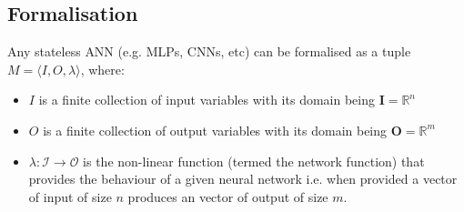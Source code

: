 
\subsection{Formalisation}

\begin{definition}
	\label{def:bb-mlp}
	Any stateless \ac{ANN} (e.g. \acp{MLP}, \acp{CNN}, etc) can be formalised as a tuple $M = \langle I, O, \lambda  \rangle$, where:
        \begin{itemize}
        \item $I$ is a finite collection of input variables with
          its domain being $\mathbf{I} =\mathbb{R}^n$
        \item  $O$ is a finite collection of  output variables with
          its domain being $\mathbf{O} = \mathbb{R}^m$
         \item $\lambda: \mathcal{I} \rightarrow \mathcal{O}$ is the non-linear
          function (termed the network function) that provides the behaviour of a given neural network i.e.
          when provided a vector of input of size $n$ produces an
          vector of output of size $m$. 
        \end{itemize}
\end{definition} 

